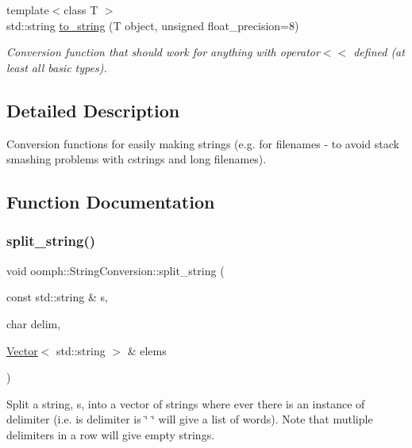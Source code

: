 \begin{DoxyCompactItemize}
{\footnotesize template$<$class T $>$ }\\std\+::string \hyperlink{namespaceoomph_1_1StringConversion_a9d30fabdc1a0694bdb91dddd2833bbd6}{to\+\_\+string} (T object, unsigned float\+\_\+precision=8)
\begin{DoxyCompactList}\small\item\em Conversion function that should work for anything with operator$<$$<$ defined (at least all basic types). \end{DoxyCompactList}\end{DoxyCompactItemize}


\subsection{Detailed Description}
Conversion functions for easily making strings (e.\+g. for filenames -\/ to avoid stack smashing problems with cstrings and long filenames). 

\subsection{Function Documentation}
\mbox{\label{namespaceoomph_1_1StringConversion_a1fe241d2c1aab5ce0a8a6bcdf7c92a4e}} 
\subsubsection{\texorpdfstring{split\+\_\+string()}{split\_string()}\hspace{0.1cm}{\footnotesize\ttfamily [1/2]}}
{\footnotesize\ttfamily void oomph\+::\+String\+Conversion\+::split\+\_\+string (\begin{DoxyParamCaption}\item[{const std\+::string \&}]{s,  }\item[{char}]{delim,  }\item[{\hyperlink{classoomph_1_1Vector}{Vector}$<$ std\+::string $>$ \&}]{elems }\end{DoxyParamCaption})}



Split a string, s, into a vector of strings where ever there is an instance of delimiter (i.\+e. is delimiter is \char`\"{} \char`\"{} will give a list of words). Note that mutliple delimiters in a row will give empty strings. 

